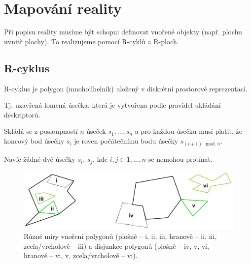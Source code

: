 
\section{Mapování reality}

\begin{compactitem}
    \item Při popisu reality musíme být schopni definovat vnořené objekty (např. plochu uvnitř plochy). To realizujeme pomocí R-cyklů a R-ploch.
\end{compactitem}

\subsection{R-cyklus}

\begin{compactitem}
    \item R-cyklus je polygon (mnohoúhelník) uložený v diskrétní prostorové reprezentaci.

    \item Tj. uzavřená lomená úsečka, která je vytvořena podle pravidel ukládání deskriptorů. \begin{compactitem}
        \item Skládá se z posloupností $n$ úseček $s_1, \ldots, s_n$ a pro každou úsečku musí platit, že koncový bod úsečky $s_i$ je roven počátečnímu bodu úsečky ${\displaystyle s_{(i+1)\mod{n}}}$.

        \item Navíc žádné dvě úsečky $s_i$, $s_j$, kde $i, j \in {1, \ldots, n}$ se nemohou protínat.
    \end{compactitem}
\end{compactitem}

\begin{figure}[H]
    \centering
    \includegraphics[width=1\linewidth]{r_loop.pdf}
    \caption{Různé míry vnoření polygonů (plošně -- i, ii, iii, hranově -- ii, iii, zcela/vrcholově -- iii) a disjunkce polygonů (plošně -- iv, v, vi, hranově -- vi, v, zcela/vrcholově -- vi).}
\end{figure}

